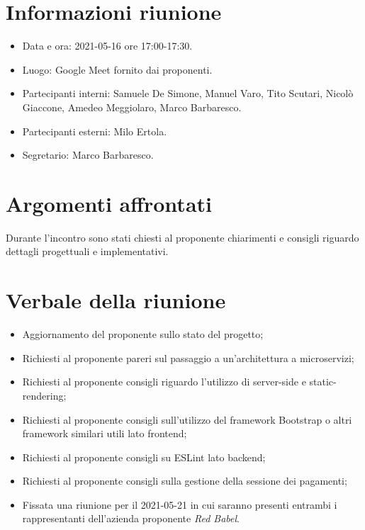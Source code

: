 \documentclass[a4paper]{article}
\begin{document}
\newpage
\tableofcontents
\newpage

\section{Informazioni riunione}
\begin{itemize}
    \item Data e ora: 2021-05-16 ore 17:00-17:30.
    \item Luogo: Google Meet fornito dai proponenti.
    \item Partecipanti interni: Samuele De Simone, Manuel Varo, Tito Scutari, Nicolò Giaccone, Amedeo Meggiolaro, Marco Barbaresco.
    \item Partecipanti esterni: Milo Ertola.
    \item Segretario: Marco Barbaresco.
\end{itemize}
\section{Argomenti affrontati}
Durante l'incontro sono stati chiesti al proponente chiarimenti e consigli riguardo dettagli progettuali e implementativi.
\section{Verbale della riunione}
\begin{itemize}
    \item Aggiornamento del proponente sullo stato del progetto;
    \item Richiesti al proponente pareri sul passaggio a un'architettura a microservizi;
    \item Richiesti al proponente consigli riguardo l'utilizzo di server-side e static-rendering;
    \item Richiesti al proponente consigli sull'utilizzo del framework Bootstrap o altri framework similari utili lato frontend;
    \item Richiesti al proponente consigli su ESLint lato backend;
    \item Richiesti al proponente consigli sulla gestione della sessione dei pagamenti;
    \item Fissata una riunione per il 2021-05-21 in cui saranno presenti entrambi i rappresentanti dell'azienda proponente \textit{Red Babel}.
\end{itemize}
\newpage
\end{document}
